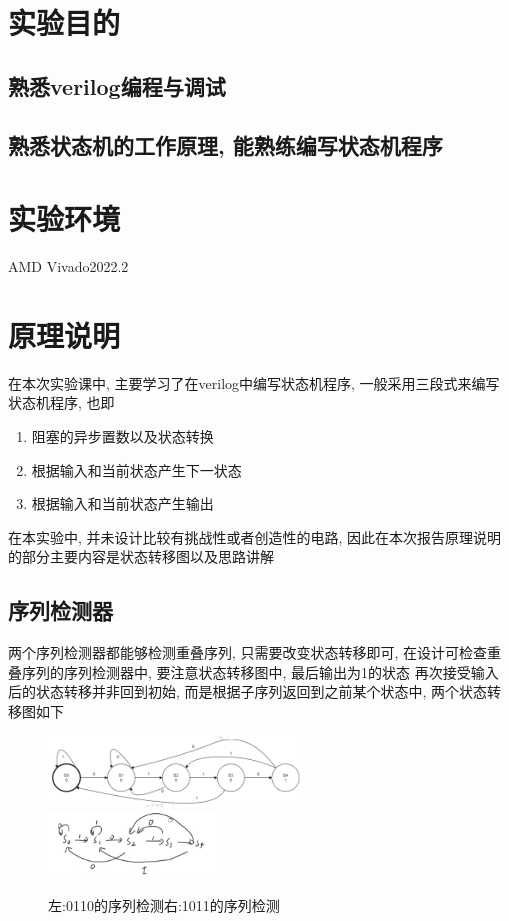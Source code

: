 \documentclass[fontset=windows,12pt]{article}
\begin{document}
\section{实验目的}
    \subsection{熟悉verilog编程与调试}
    \subsection{熟悉状态机的工作原理, 能熟练编写状态机程序}




\section{实验环境}
    AMD Vivado2022.2





\section{原理说明}
    在本次实验课中, 主要学习了在verilog中编写状态机程序, 一般采用三段式来编写状态机程序, 也即
    \begin{enumerate}
        \item 阻塞的异步置数以及状态转换
        \item 根据输入和当前状态产生下一状态
        \item 根据输入和当前状态产生输出
    \end{enumerate}
    在本实验中, 并未设计比较有挑战性或者创造性的电路, 因此在本次报告原理说明的部分主要内容是状态转移图以及思路讲解
    \subsection{序列检测器}
        两个序列检测器都能够检测重叠序列, 只需要改变状态转移即可, 在设计可检查重叠序列的序列检测器中, 要注意状态转移图中, 最后输出为1的状态
        再次接受输入后的状态转移并非回到初始, 而是根据子序列返回到之前某个状态中, 两个状态转移图如下
        \begin{figure}[ht]
            \includegraphics[width=0.6\textwidth]{转移图1.jpg}
            \includegraphics[width=0.4\textwidth]{转移图2.jpg}
            \caption{左:0110的序列检测\qquad 右:1011的序列检测}
        \end{figure}
\end{document}
